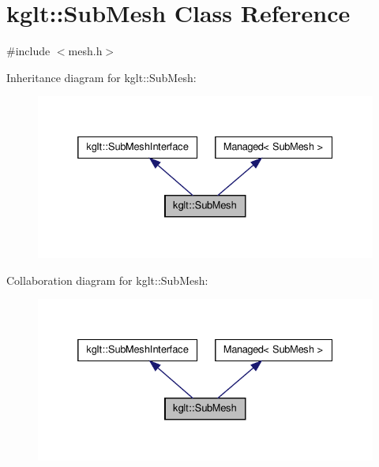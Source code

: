 \hypertarget{classkglt_1_1_sub_mesh}{\section{kglt\-:\-:Sub\-Mesh Class Reference}
\label{classkglt_1_1_sub_mesh}
}


{\ttfamily \#include $<$mesh.\-h$>$}



Inheritance diagram for kglt\-:\-:Sub\-Mesh\-:\nopagebreak
\begin{figure}[H]
\begin{center}
\leavevmode
\includegraphics[width=332pt]{classkglt_1_1_sub_mesh__inherit__graph}
\end{center}
\end{figure}


Collaboration diagram for kglt\-:\-:Sub\-Mesh\-:\nopagebreak
\begin{figure}[H]
\begin{center}
\leavevmode
\includegraphics[width=332pt]{classkglt_1_1_sub_mesh__coll__graph}
\end{center}
\end{figure}
